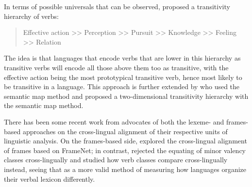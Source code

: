 
In terms of possible universals that can be observed, \citet{tsunoda1981, tsunoda1985} proposed a transitivity hierarchy of verbs:
\begin{quote}
    Effective action >> Perception >> Pursuit >> Knowledge >> Feeling >> Relation
\end{quote}
The idea is that languages that encode verbs that are lower in this hierarchy as transitive verbs will encode all those above them too as transitive, with the effective action being the most prototypical transitive verb, hence most likely to be transitive in a language. This approach is further extended by \citet{malchukov2005} who used the semantic map method and proposed a two-dimensional transitivity hierarchy with the semantic map method. 

There has been some recent work from advocates of both the lexeme- and frames-based approaches on the cross-lingual alignment of their respective units of linguistic analysis. On the frames-based side, \citet{baker2020, ellsworth2021} explored the cross-lingual alignment of frames based on FrameNet; in contrast, \citet{say2014} rejected the equating of minor valency classes cross-lingually and studied how verb classes compare cross-lingually instead, seeing that as a more valid method of measuring how languages organize their verbal lexicon differently.

